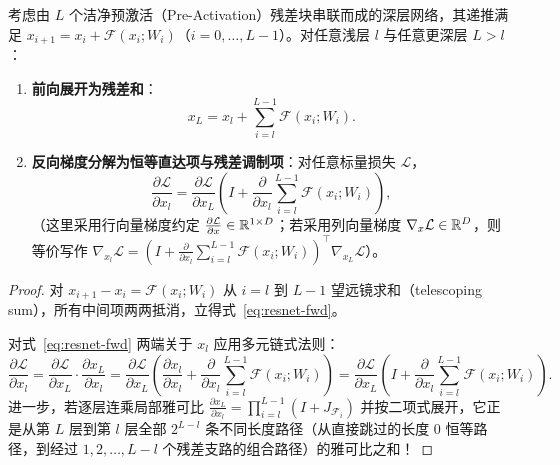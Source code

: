 \begin{thmBox}
\begin{theorem}[残差网络的梯度高速公路定理（He et al., 2016）]
\label{thm:resnet-highway}
考虑由 $L$ 个洁净预激活（Pre-Activation）残差块串联而成的深层网络，其递推满足 $x_{i+1} = x_i + \mathcal{F}(x_i; W_i)$（$i = 0, \dots, L-1$）。对任意浅层 $l$ 与任意更深层 $L > l$：
\begin{enumerate}
  \item \textbf{前向展开为残差和}：
  \begin{equation}
    x_L = x_l + \sum_{i=l}^{L-1} \mathcal{F}(x_i; W_i).
    \label{eq:resnet-fwd}
  \end{equation}
  \item \textbf{反向梯度分解为恒等直达项与残差调制项}：对任意标量损失 $\mathcal{L}$，
  \begin{equation}
    \frac{\partial \mathcal{L}}{\partial x_l}
    = \frac{\partial \mathcal{L}}{\partial x_L}\left(I + \frac{\partial}{\partial x_l}\sum_{i=l}^{L-1} \mathcal{F}(x_i; W_i)\right),
    \label{eq:resnet-bwd}
  \end{equation}
  （这里采用行向量梯度约定 $\frac{\partial \mathcal{L}}{\partial x} \in \mathbb{R}^{1 \times D}$；若采用列向量梯度 $\nabla_x \mathcal{L} \in \mathbb{R}^D$，则等价写作 $\nabla_{x_l}\mathcal{L} = \left(I + \frac{\partial}{\partial x_l}\sum_{i=l}^{L-1}\mathcal{F}(x_i; W_i)\right)^\top \nabla_{x_L}\mathcal{L}$）。
\end{enumerate}
\end{theorem}
\begin{proof}
对 $x_{i+1} - x_i = \mathcal{F}(x_i; W_i)$ 从 $i = l$ 到 $L-1$ 望远镜求和（telescoping sum），所有中间项两两抵消，立得式~\eqref{eq:resnet-fwd}。

对式~\eqref{eq:resnet-fwd} 两端关于 $x_l$ 应用多元链式法则：
\[
  \frac{\partial \mathcal{L}}{\partial x_l}
  = \frac{\partial \mathcal{L}}{\partial x_L} \cdot \frac{\partial x_L}{\partial x_l}
  = \frac{\partial \mathcal{L}}{\partial x_L} \left(\frac{\partial x_l}{\partial x_l} + \frac{\partial}{\partial x_l}\sum_{i=l}^{L-1}\mathcal{F}(x_i; W_i)\right)
  = \frac{\partial \mathcal{L}}{\partial x_L} \left(I + \frac{\partial}{\partial x_l}\sum_{i=l}^{L-1}\mathcal{F}(x_i; W_i)\right).
\]
进一步，若逐层连乘局部雅可比 $\frac{\partial x_L}{\partial x_l} = \prod_{i=l}^{L-1} \left(I + J_{\mathcal{F}_i}\right)$ 并按二项式展开，它正是从第 $L$ 层到第 $l$ 层全部 $2^{L-l}$ 条不同长度路径（从直接跳过的长度 $0$ 恒等路径，到经过 $1, 2, \dots, L-l$ 个残差支路的组合路径）的雅可比之和！
\end{proof}
\end{thmBox}

